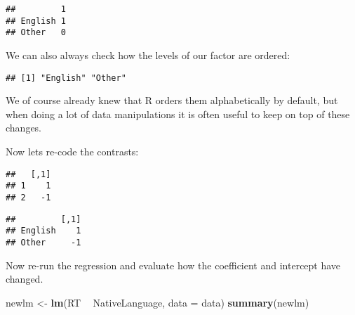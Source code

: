 \documentclass[
]{article}
\newenvironment{Shaded}{\begin{snugshade}}{\end{snugshade}}
\newcommand{\DataTypeTok}[1]{\textcolor[rgb]{0.13,0.29,0.53}{#1}}
\newcommand{\DecValTok}[1]{\textcolor[rgb]{0.00,0.00,0.81}{#1}}
\newcommand{\KeywordTok}[1]{\textcolor[rgb]{0.13,0.29,0.53}{\textbf{#1}}}
\newcommand{\NormalTok}[1]{#1}
\newcommand{\OperatorTok}[1]{\textcolor[rgb]{0.81,0.36,0.00}{\textbf{#1}}}
\newcommand{\StringTok}[1]{\textcolor[rgb]{0.31,0.60,0.02}{#1}}
\begin{document}
\begin{verbatim}
##         1
## English 1
## Other   0
\end{verbatim}

We can also always check how the levels of our factor are ordered:

\begin{Shaded}
\end{Shaded}

\begin{verbatim}
## [1] "English" "Other"
\end{verbatim}

We of course already knew that R orders them alphabetically by default,
but when doing a lot of data manipulations it is often useful to keep on
top of these changes.

Now lets re-code the contrasts:

\begin{Shaded}
\end{Shaded}

\begin{verbatim}
##   [,1]
## 1    1
## 2   -1
\end{verbatim}

\begin{Shaded}
\end{Shaded}

\begin{verbatim}
##         [,1]
## English    1
## Other     -1
\end{verbatim}

Now re-run the regression and evaluate how the coefficient and intercept
have changed.

\begin{Shaded}
\begin{Highlighting}[]
\NormalTok{newlm <-}\StringTok{ }\KeywordTok{lm}\NormalTok{(RT }\OperatorTok{~}\StringTok{ }\NormalTok{NativeLanguage, }\DataTypeTok{data =}\NormalTok{ data)}
\KeywordTok{summary}\NormalTok{(newlm)}
\end{Highlighting}
\end{Shaded}
\end{document}
